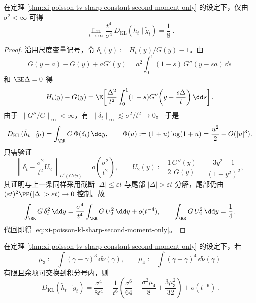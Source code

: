 \begin{theorem}\label{thm:xi-poisson-kl-sharp-second-moment-only}
在定理 \ref{thm:xi-poisson-tv-sharp-constant-second-moment-only} 的设定下，仅由 \(\sigma^2<\infty\) 可得
\begin{equation}\label{eq:xi-poisson-kl-sharp-second-moment-only}
\boxed{\;
\lim_{t\to\infty}\frac{t^4}{\sigma^4}\,
D_{\mathrm{KL}}(\tilde h_t\mid \tilde g_t)
=\frac18\; }.
\end{equation}
\end{theorem}

\begin{proof}
沿用尺度变量记号，令 \(\delta_t(y):=H_t(y)/G(y)-1\)。由
\[
G(y-a)-G(y)+aG'(y)
=a^2\int_0^1(1-s)\,G''(y-sa)\,\dd s
\]
和 \(\EE\Delta=0\) 得
\[
H_t(y)-G(y)
=\E\!\left[\frac{\Delta^2}{t^2}\int_0^1(1-s)G''\!\left(y-\frac{s\Delta}{t}\right)\dd s\right].
\]
由于 \(\|G''/G\|_\infty<\infty\)，有 \(\|\delta_t\|_\infty\lesssim \sigma^2/t^2\to0\)。
于是
\[
D_{\mathrm{KL}}(\tilde h_t\mid \tilde g_t)
=\int_{\RR}G\,\Phi(\delta_t)\,\dd y,\qquad
\Phi(u):=(1+u)\log(1+u)
=\frac{u^2}{2}+O(|u|^3).
\]
只需验证
\[
\left\|\delta_t-\frac{\sigma^2}{t^2}U_2\right\|_{L^2(G\dd y)}
=o\!\left(\frac{\sigma^2}{t^2}\right),\qquad
U_2(y):=\frac12\frac{G''(y)}{G(y)}=\frac{3y^2-1}{(1+y^2)^2},
\]
其证明与上一条同样采用截断 \(|\Delta|\le \varepsilon t\) 与尾部 \(|\Delta|>\varepsilon t\) 分解，尾部仍由
\((\varepsilon t)^2\PP(|\Delta|>\varepsilon t)\to0\) 控制。故
\[
\int_{\RR}G\,\delta_t^2\,\dd y
=\frac{\sigma^4}{t^4}\int_{\RR}G\,U_2^2\,\dd y+o(t^{-4}),
\qquad
\int_{\RR}G\,U_2^2\,\dd y=\frac14.
\]
代回即得 \eqref{eq:xi-poisson-kl-sharp-second-moment-only}。
\end{proof}

\begin{theorem}\label{thm:xi-poisson-kl-sixth-order-mu3-mu4}
在定理 \ref{thm:xi-poisson-tv-sharp-constant-second-moment-only} 的设定下，若
\[
\mu_3:=\int(\gamma-\bar\gamma)^3\,\dd\tilde\nu(\gamma),\qquad
\mu_4:=\int(\gamma-\bar\gamma)^4\,\dd\tilde\nu(\gamma)
\]
有限且余项可交换到积分号内，则
\begin{equation}\label{eq:xi-poisson-kl-sixth-order-mu3-mu4}
\boxed{\;
D_{\mathrm{KL}}(\tilde h_t\mid \tilde g_t)
=\frac{\sigma^4}{8t^4}
+\frac{1}{t^6}\left(
\frac{\sigma^6}{64}
-\frac{\sigma^2\mu_4}{8}
+\frac{3\mu_3^2}{32}
\right)
+o(t^{-6})\; }.
\end{equation}
\end{theorem}

